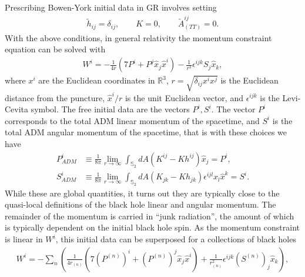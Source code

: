 \documentclass{ws-ijmpd}
\begin{document}
Prescribing Bowen-York initial data in GR\cite{PhysRevD.21.2047,Brandt:1997tf} 
involves setting 
\begin{align}
   \tilde{h}_{ij}
   =
   \delta_{ij}
   ,\qquad
   K
   =
   0
   ,\qquad
   \tilde{A}_{(TT)}^{ij}
   =
   0
   .
\end{align}
With the above conditions,
in general relativity the momentum constraint equation can be solved with
\begin{align}
   W^i
   =
   -
   \frac{1}{4r}\left(7P^i + P^j\hat{x}_j \hat{x}^i\right)
   -
   \frac{1}{r^2}\epsilon^{ijk}S_j\hat{x}_k
   ,
\end{align}
where $x^i$ are the Euclidean coordinates in $\mathbb{R}^3$,
$r=\sqrt{\delta_{ij}x^ix^j}$ is the Euclidean distance from the puncture,
$\hat{x}^i/r$ is the unit Euclidean vector, and $\epsilon^{ijk}$
is the Levi-Cevita symbol.
The free initial data are the vectors $P^i,S^i$.
The vector $P^i$ corresponds to the total ADM linear momentum
of the spacetime, and $S^i$ is the total ADM angular momentum 
of the spacetime\cite{PhysRevD.21.2047}, that is with these choices we have 
\begin{subequations}
\label{eq:adm_momenta_puncture_gr}
   \begin{align}
   P_{ADM}^i
   &\equiv
   \frac{1}{8\pi}\lim_{r\to\infty}\int_{\mathbb{S}_2} dA\left(
      K^{ij}
      -
      K
      h^{ij}
   \right)
   \hat{x}_j
   =
   P^i
   ,\\
   S^i_{ADM}
   &\equiv
   \frac{1}{8\pi}\lim_{r\to\infty}\int_{\mathbb{S}_2} dA\left(
      K_{jk}
      -
      K
      h_{jk}
   \right)
   \epsilon^{ijl}x_l\hat{x}^k
   =
   S^i
   .
\end{align}
\end{subequations}
While these are global quantities, it turns out they are typically
close to the quasi-local definitions of the black hole linear
and angular momentum. The remainder of the momentum is carried
in ``junk radiation'', the amount of which is typically dependent on
the initial black hole spin.
As the momentum constraint is linear in $W^i$, this initial data can 
be superposed for a collections of black holes
\begin{align}
   W^i
   =
   -
   \sum_n
      \left(
         \frac{1}{4r_{(n)}}\left(
            7\left(P^{(n)}\right)^i 
            + 
            \left(P^{(n)}\right)^j\hat{x}_j \hat{x}^i
         \right)
         +
         \frac{1}{r_{(n)}^2}\epsilon^{ijk}\left(S^{(n)}\right)_j\hat{x}_k
      \right)
   ,
\end{align}
\end{document}
